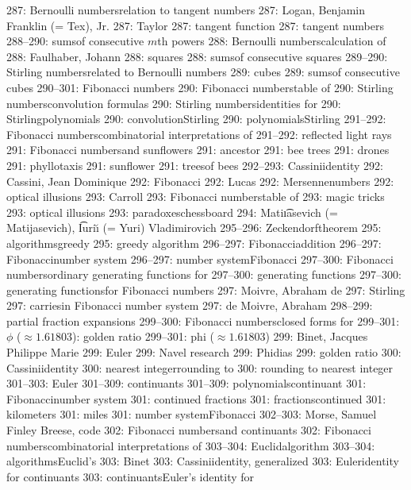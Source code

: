 287: Bernoulli numbers\sub relation to tangent numbers
287: Logan, Benjamin Franklin (= Tex), Jr.
287: Taylor
287: tangent function
287: tangent numbers
288--290: sums\sub of consecutive $m$th powers
288: Bernoulli numbers\sub calculation of
288: Faulhaber, Johann
288: squares
288: sums\sub of consecutive squares
289--290: Stirling numbers\sub related to Bernoulli numbers
289: cubes
289: sums\sub of consecutive cubes
290--301: Fibonacci numbers
290: Fibonacci numbers\sub table of
290: Stirling numbers\sub convolution formulas
290: Stirling numbers\sub identities for
290: Stirling\sub polynomials
290: convolution\sub Stirling
290: polynomials\sub Stirling
291--292: Fibonacci numbers\sub combinatorial interpretations of
291--292: reflected light rays
291: Fibonacci numbers\sub and sunflowers
291: ancestor
291: bee trees
291: drones
291: phyllotaxis
291: sunflower
291: trees\sub of bees
292--293: Cassini\sub identity
292: Cassini, Jean Dominique
292: Fibonacci
292: Lucas
292: Mersenne\sub numbers
292: optical illusions
293: Carroll
293: Fibonacci numbers\sub table of
293: magic tricks
293: optical illusions
293: paradoxes\sub chessboard
294: Mati{\t\i}asevich (= Matijasevich), \t{I}uri{\u\i} (= Yuri) Vladimirovich
295--296: Zeckendorf\sub theorem
295: algorithms\sub greedy
295: greedy algorithm
296--297: Fibonacci\sub addition
296--297: Fibonacci\sub number system
296--297: number system\sub Fibonacci
297--300: Fibonacci numbers\sub ordinary generating functions for
297--300: generating functions
297--300: generating functions\sub for Fibonacci numbers
297: Moivre, Abraham de
297: Stirling
297: carries\sub in Fibonacci number system
297: de Moivre, Abraham
298--299: partial fraction expansions
299--300: Fibonacci numbers\sub closed forms for
299--301: $\phi$ ($\approx1.61803$): golden ratio
299--301: phi ($\approx1.61803$)
299: Binet, Jacques Philippe Marie
299: Euler
299: Navel research
299: Phidias
299: golden ratio
300: Cassini\sub identity
300: nearest integer\sub rounding to
300: rounding to nearest integer
301--303: Euler
301--309: continuants
301--309: polynomials\sub continuant
301: Fibonacci\sub number system
301: continued fractions
301: fractions\sub continued
301: kilometers
301: miles
301: number system\sub Fibonacci
302--303: Morse, Samuel Finley Breese, code
302: Fibonacci numbers\sub and continuants
302: Fibonacci numbers\sub combinatorial interpretations of
303--304: Euclid\sub algorithm
303--304: algorithms\sub Euclid's
303: Binet
303: Cassini\sub identity, generalized
303: Euler\sub identity for continuants
303: continuants\sub Euler's identity for
